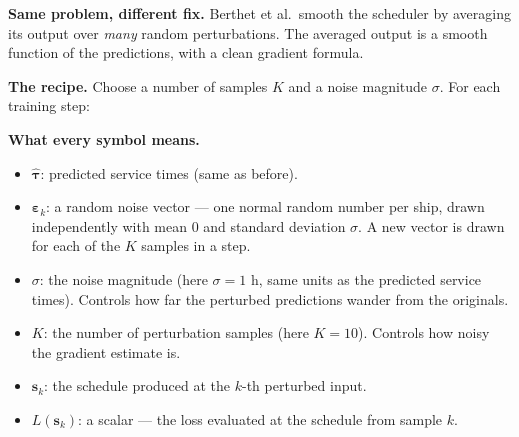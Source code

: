 \documentclass[11pt]{article}
\begin{document}
\noindent
\textbf{Same problem, different fix.} Berthet et al.\ smooth the
scheduler by averaging its output over \emph{many} random
perturbations. The averaged output is a smooth function of the
predictions, with a clean gradient formula.

\noindent
\textbf{The recipe.} Choose a number of samples $K$ and a noise
magnitude $\sigma$. For each training step:

\begin{center}
\end{center}

\noindent
\textbf{What every symbol means.}
\begin{itemize}\setlength{\itemsep}{0pt}
  \item $\hat{\boldsymbol{\tau}}$: predicted service times (same as
        before).
  \item $\boldsymbol{\varepsilon}_k$: a random noise vector ---
        one normal random number per ship, drawn independently with
        mean $0$ and standard deviation $\sigma$. A new vector is
        drawn for each of the $K$ samples in a step.
  \item $\sigma$: the noise magnitude (here $\sigma = 1$ h, same
        units as the predicted service times). Controls how far the
        perturbed predictions wander from the originals.
  \item $K$: the number of perturbation samples (here $K = 10$).
        Controls how noisy the gradient estimate is.
  \item $\boldsymbol{s}_k$: the schedule produced at the $k$-th
        perturbed input.
  \item $L(\boldsymbol{s}_k)$: a scalar --- the loss evaluated at
        the schedule from sample $k$.
\end{itemize}
\end{document}
